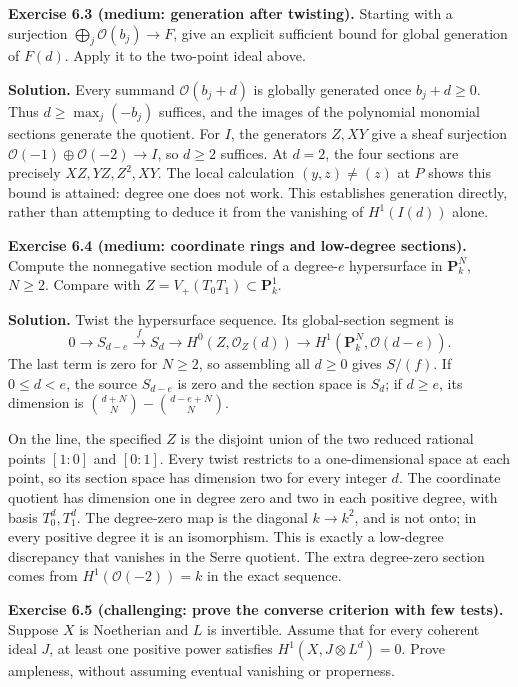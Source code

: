 \documentclass[11pt]{article}
\begin{document}
\textbf{Exercise 6.3 (medium: generation after twisting).} Starting with
a surjection \(\bigoplus_j\mathcal O(b_j)\to F\), give an explicit
sufficient bound for global generation of \(F(d)\). Apply it to the
two-point ideal above.

\textbf{Solution.} Every summand \(\mathcal O(b_j+d)\) is globally
generated once \(b_j+d\ge0\). Thus \(d\ge\max_j(-b_j)\) suffices, and
the images of the polynomial monomial sections generate the quotient.
For \(I\), the generators \(Z,XY\) give a sheaf surjection
\(\mathcal O(-1)\oplus\mathcal O(-2)\to I\), so \(d\ge2\) suffices. At
\(d=2\), the four sections are precisely \(XZ,YZ,Z^2,XY\). The local
calculation \((y,z)\ne(z)\) at \(P\) shows this bound is attained:
degree one does not work. This establishes generation directly, rather
than attempting to deduce it from the vanishing of \(H^1(I(d))\) alone.

\textbf{Exercise 6.4 (medium: coordinate rings and low-degree
sections).} Compute the nonnegative section module of a degree-\(e\)
hypersurface in \(\mathbf P_k^N\), \(N\ge2\). Compare with
\(Z=V_+(T_0T_1)\subset\mathbf P_k^1\).

\textbf{Solution.} Twist the hypersurface sequence. Its global-section
segment is \[
0\to S_{d-e}\xrightarrow{\ f\ }S_d\to H^0(Z,\mathcal O_Z(d))
\to H^1(\mathbf P_k^N,\mathcal O(d-e)).
\] The last term is zero for \(N\ge2\), so assembling all \(d\ge0\)
gives \(S/(f)\). If \(0\le d<e\), the source \(S_{d-e}\) is zero and the
section space is \(S_d\); if \(d\ge e\), its dimension is
\(\binom{d+N}N-\binom{d-e+N}N\).

On the line, the specified \(Z\) is the disjoint union of the two
reduced rational points \([1:0]\) and \([0:1]\). Every twist restricts
to a one-dimensional space at each point, so its section space has
dimension two for every integer \(d\). The coordinate quotient has
dimension one in degree zero and two in each positive degree, with basis
\(T_0^d,T_1^d\). The degree-zero map is the diagonal \(k\to k^2\), and
is not onto; in every positive degree it is an isomorphism. This is
exactly a low-degree discrepancy that vanishes in the Serre quotient.
The extra degree-zero section comes from \(H^1(\mathcal O(-2))=k\) in
the exact sequence.

\textbf{Exercise 6.5 (challenging: prove the converse criterion with few
tests).} Suppose \(X\) is Noetherian and \(L\) is invertible. Assume
that for every coherent ideal \(J\), at least one positive power
satisfies \(H^1(X,J\otimes L^d)=0\). Prove ampleness, without assuming
eventual vanishing or properness.
\end{document}
